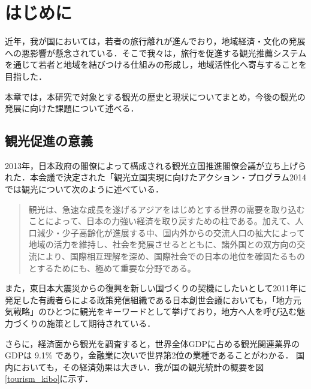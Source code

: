 \documentclass{jsarticle}
\begin{document}
\tableofcontents
\newpage
\listoftables
\newpage
\listoffigures
\newpage

\section{はじめに}

近年，我が国においては，若者の旅行離れが進んでおり，地域経済・文化の発展への悪影響が懸念されている．そこで我々は，旅行を促進する観光推薦システムを通じて若者と地域を結びつける仕組みの形成し，地域活性化へ寄与することを目指した．

本章では，本研究で対象とする観光の歴史と現状についてまとめ，今後の観光の発展に向けた課題について述べる．

\newpage

\subsection{観光促進の意義}

2013年，日本政府の閣僚によって構成される観光立国推進閣僚会議が立ち上げられた．本会議で決定された「観光立国実現に向けたアクション・プログラム2014\cite{action_program_2014}では観光について次のように述べている．

\begin{quote}
観光は、急速な成長を遂げるアジアをはじめとする世界の需要を取り込むことによって、日本の力強い経済を取り戻すための柱である。加えて、人口減少・少子高齢化が進展する中、国内外からの交流人口の拡大によって地域の活力を維持し、社会を発展させるとともに、諸外国との双方向の交流により、国際相互理解を深め、国際社会での日本の地位を確固たるものとするためにも、極めて重要な分野である。
\end{quote}

また，東日本大震災からの復興を新しい国づくりの契機にしたいとして2011年に発足した有識者らによる政策発信組織である日本創世会議においても，「地方元気戦略」のひとつに観光をキーワードとして挙げており，地方へ人を呼び込む魅力づくりの施策として期待されている．

さらに，経済面から観光を調査すると，世界全体GDPに占める観光関連業界のGDPは 9.1\% であり，金融業に次いで世界第2位の業種であることがわかる．
国内においても，その経済効果は大きい．我が国の観光統計の概要を図\ref{tourism_kibo}に示す．
\end{document}
